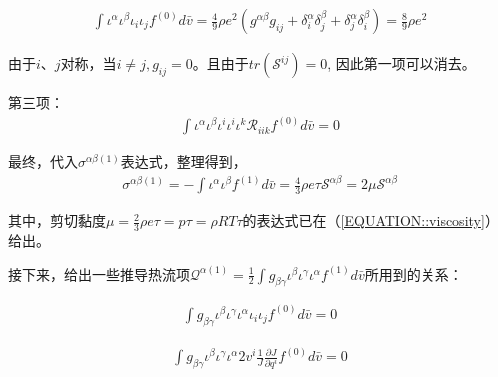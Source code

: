 \documentclass[LBMDerivation.tex]{subfiles}
\begin{document}
\begin{equation}
  \begin{gathered}
    \int \iota^\alpha \iota^\beta \iota_i \iota_j  f^{(0)}  d \bar{v}=\frac{4}{9}\rho e^2 (g^{\alpha \beta}g_{ij}+\delta^{\alpha}_i \delta^{\beta}_j+\delta^{\alpha}_j \delta^{\beta}_i)=\frac{8}{9}\rho e^2
  \end{gathered}
\end{equation}

由于$i$、$j$对称，当$i\neq j,g_{ij}=0$。且由于$tr(\mathcal{S}^{ij})=0$, 因此第一项可以消去。

第三项：
\begin{equation}
  \begin{gathered}
    \int \iota^\alpha \iota^\beta \iota^i\iota^i\iota^k \mathcal{R}_{iik}  f^{(0)}   d \bar{v} =0
  \end{gathered}
\end{equation}




最终，代入$\sigma^{\alpha\beta(1)}$表达式，整理得到，
\begin{equation}
  \begin{gathered}
    \sigma^{\alpha\beta(1)} =-\int \iota^{\alpha} \iota^{\beta} f^{(1)}  d \bar{v}
    = \frac{4}{3} \rho e \tau  \mathcal{S}^{\alpha\beta} =  2 \mu \mathcal{S}^{\alpha\beta}
  \end{gathered}
\end{equation}


其中，剪切黏度$\mu=\frac{2}{3} \rho e \tau=p \tau=\rho R T \tau$的表达式已在（\ref{EQUATION::viscosity}）给出。


接下来，给出一些推导热流项$\mathcal{Q}^{\alpha (1)}=\frac{1}{2}\int g_{\beta\gamma} \iota^{\beta} \iota^{\gamma}  \iota^{\alpha} f^{(1)}  d \bar{v}$所用到的关系：

\begin{equation}
  \begin{gathered}
    \int g_{\beta\gamma} \iota^{\beta} \iota^{\gamma}  \iota^{\alpha} \iota_i \iota_j  f^{(0)}  d \bar{v} =0
  \end{gathered}
\end{equation}






\begin{equation}
  \begin{gathered}
    \int g_{\beta\gamma} \iota^{\beta} \iota^{\gamma} \iota^{\alpha} 2v^i  \frac{1}{J}\frac{\partial J}{\partial q^i}  f^{(0)} d \bar{v} = 0
  \end{gathered}
\end{equation}
\end{document}
